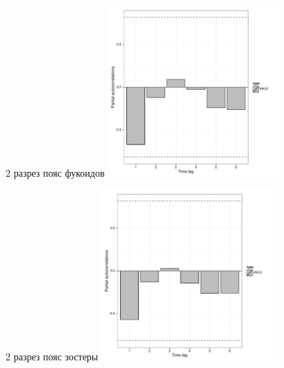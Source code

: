 \documentclass[12pt, a4paper]{disser}
\begin{document}
	\begin{figure}[ht]
	
	\begin{minipage}[b]{.46\linewidth}
	\begin{center}
	{\tiny 2 разрез пояс фукоидов}
		\includegraphics[width=65mm]{../White_Sea/dynamic_N_N1/PRCF_razrez2_fucus_zone_.pdf}

	\end{center}
	\end{minipage}
	\hfil %
	\begin{minipage}[b]{.46\linewidth}
	\begin{center}
	{\tiny 2 разрез пояс зостеры}
		\includegraphics[width=65mm]{../White_Sea/dynamic_N_N1/PRCF_razrez2_zostera_zone_.pdf}
	\end{center}
	\end{minipage}




\end{figure}
\end{document}
